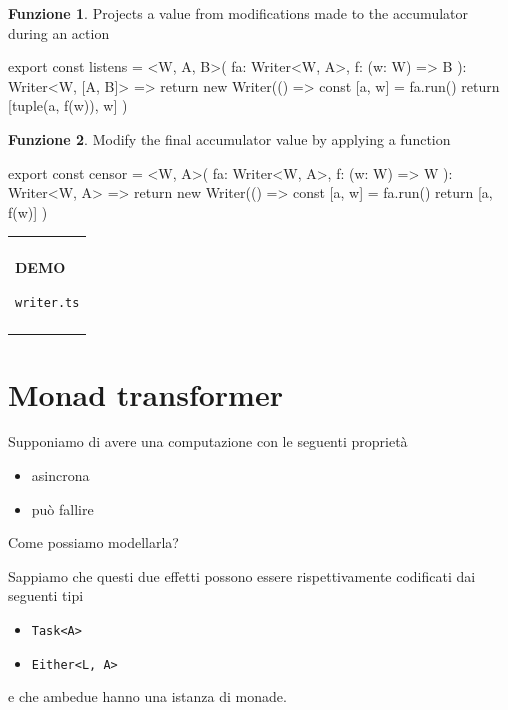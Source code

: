 \documentclass[12pt]{article}
\theoremstyle{definition}
\newtheorem{function}{Funzione}[section]
\newenvironment{demo}
    {\begin{center}
    \begin{tabular}{|p{0.9\textwidth}|}
    \hline\\
    }
    {
    \\\\\hline
    \end{tabular}
    \end{center}
    }
\newenvironment{code}
  {\vspace{0.5cm} \VerbatimEnvironment\begin{typescriptcode}}
  {\end{typescriptcode} \vspace{0.2cm}}
\begin{document}
\begin{function}
Projects a value from modifications made to the accumulator during an action

\begin{code}
export const listens = <W, A, B>(
  fa: Writer<W, A>,
  f: (w: W) => B
): Writer<W, [A, B]> => {
  return new Writer(() => {
    const [a, w] = fa.run()
    return [tuple(a, f(w)), w]
  })
}
\end{code}
\end{function}

\begin{function}
Modify the final accumulator value by applying a function

\begin{code}
export const censor = <W, A>(
  fa: Writer<W, A>,
  f: (w: W) => W
): Writer<W, A> => {
  return new Writer(() => {
    const [a, w] = fa.run()
    return [a, f(w)]
  })
}
\end{code}
\end{function}

\begin{demo}
\begin{center}
\textbf{DEMO}

\texttt{writer.ts}
\end{center}
\end{demo}

\newpage

\section{Monad transformer}

Supponiamo di avere una computazione con le seguenti proprietà

\begin{itemize}
\item asincrona
\item può fallire
\end{itemize}

Come possiamo modellarla?

Sappiamo che questi due effetti possono essere rispettivamente codificati dai seguenti tipi

\begin{itemize}
\item \texttt{Task<A>}
\item \texttt{Either<L, A>}
\end{itemize}

e che ambedue hanno una istanza di monade.
\end{document}
